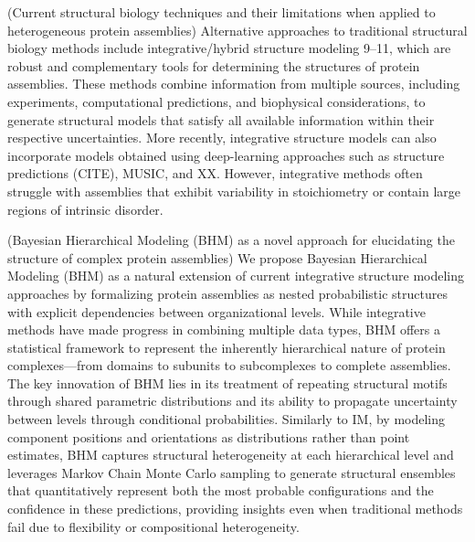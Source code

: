 \documentclass[pdflatex,sn-mathphys-num]{sn-jnl}%
\theoremstyle{thmstyleone}%
\newcommand{\ignacia}[1]{%
    \textcolor{ignacia} {#1}%
}
\theoremstyle{thmstyletwo}%
\theoremstyle{thmstylethree}%
\begin{document}
{(Current structural biology techniques and their limitations when applied to heterogeneous protein assemblies) \ignacia{Alternative approaches to traditional structural biology methods include} integrative/hybrid structure modeling 9–11, which are robust and complementary tools for determining the structures of protein assemblies. These methods combine information from multiple sources, including experiments, computational predictions, and biophysical considerations, to generate structural models that satisfy all available information within their respective uncertainties. More recently, integrative structure models can also incorporate models obtained using deep-learning approaches such as structure predictions \cite{Stahl23NatBiotechnol41p1810} (CITE), MUSIC, and XX. However, integrative methods often struggle with assemblies that exhibit variability in stoichiometry or contain large regions of intrinsic disorder.  

(Bayesian Hierarchical Modeling (BHM) as a novel approach for elucidating the structure of complex protein assemblies) We propose Bayesian Hierarchical Modeling (BHM) as a natural extension of current integrative structure modeling approaches by formalizing protein assemblies as nested probabilistic structures with explicit dependencies between organizational levels. While integrative methods have made progress in combining multiple data types, BHM offers a statistical framework to represent the inherently hierarchical nature of protein complexes—from domains to subunits to subcomplexes to complete assemblies. The key innovation of BHM lies in its treatment of repeating structural motifs through shared parametric distributions and its ability to propagate uncertainty between levels through conditional probabilities. Similarly to IM, by modeling component positions and orientations as distributions rather than point estimates, BHM captures structural heterogeneity at each hierarchical level and leverages Markov Chain Monte Carlo sampling to generate structural ensembles that quantitatively represent both the most probable configurations and the confidence in these predictions, providing insights even when traditional methods fail due to flexibility or compositional heterogeneity.

}
\end{document}
